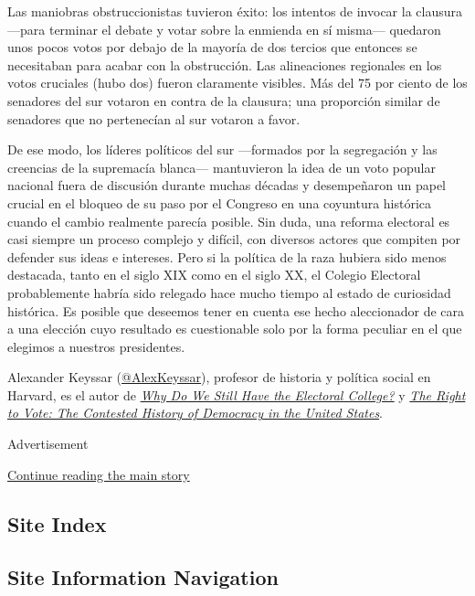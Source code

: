 Las maniobras obstruccionistas tuvieron éxito: los intentos de invocar
la clausura ---para terminar el debate y votar sobre la enmienda en sí
misma--- quedaron unos pocos votos por debajo de la mayoría de dos
tercios que entonces se necesitaban para acabar con la obstrucción. Las
alineaciones regionales en los votos cruciales (hubo dos) fueron
claramente visibles. Más del 75 por ciento de los senadores del sur
votaron en contra de la clausura; una proporción similar de senadores
que no pertenecían al sur votaron a favor.

De ese modo, los líderes políticos del sur ---formados por la
segregación y las creencias de la supremacía blanca--- mantuvieron la
idea de un voto popular nacional fuera de discusión durante muchas
décadas y desempeñaron un papel crucial en el bloqueo de su paso por el
Congreso en una coyuntura histórica cuando el cambio realmente parecía
posible. Sin duda, una reforma electoral es casi siempre un proceso
complejo y difícil, con diversos actores que compiten por defender sus
ideas e intereses. Pero si la política de la raza hubiera sido menos
destacada, tanto en el siglo XIX como en el siglo XX, el Colegio
Electoral probablemente habría sido relegado hace mucho tiempo al estado
de curiosidad histórica. Es posible que deseemos tener en cuenta ese
hecho aleccionador de cara a una elección cuyo resultado es cuestionable
solo por la forma peculiar en el que elegimos a nuestros presidentes.

Alexander Keyssar
(\href{https://twitter.com/alexkeyssar?lang=en}{@AlexKeyssar}), profesor
de historia y política social en Harvard, es el autor de
\href{https://www.hup.harvard.edu/catalog.php?isbn=9780674660151\#:~:text=After\%20tracing\%20the\%20Electoral\%20College's,showing\%20why\%20each\%20has\%20failed.}{\emph{Why
Do We Still Have the Electoral College?}} y
\href{https://www.basicbooks.com/titles/alexander-keyssar/the-right-to-vote/9780465005024/}{\emph{The
Right to Vote: The Contested History of Democracy in the United
States}}.

Advertisement

\protect\hyperlink{after-bottom}{Continue reading the main story}

\hypertarget{site-index}{%
\subsection{Site Index}\label{site-index}}

\hypertarget{site-information-navigation}{%
\subsection{Site Information
Navigation}\label{site-information-navigation}}

